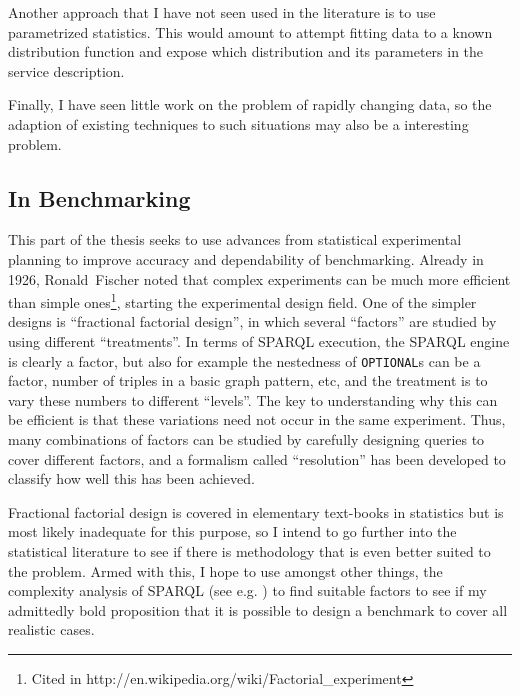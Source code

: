 \documentclass{llncs}
\begin{document}
Another approach that I have not seen used in the literature is to use
parametrized statistics. This would amount to attempt fitting data to
a known distribution function and expose which distribution and its
parameters in the service description.

Finally, I have seen little work on the problem of rapidly changing
data, so the adaption of existing techniques to such situations may
also be a interesting problem.


\subsection{In Benchmarking}

This part of the thesis seeks to use advances from statistical
experimental planning to improve accuracy and dependability of
benchmarking. Already in 1926, Ronald~Fischer noted that complex
experiments can be much more efficient than simple ones\footnote{Cited
  in http://en.wikipedia.org/wiki/Factorial\_experiment}, starting the
experimental design field. One of the simpler designs is ``fractional
factorial design'', in which several ``factors'' are studied by using
different ``treatments''. In terms of SPARQL execution, the SPARQL
engine is clearly a factor, but also for example the nestedness of
\texttt{OPTIONAL}s can be a factor, number of triples in a basic graph
pattern, etc, and the treatment is to vary these numbers to different
``levels''. The key to understanding why this can be efficient is that
these variations need not occur in the same experiment. Thus, many
combinations of factors can be studied by carefully designing queries
to cover different factors, and a formalism called ``resolution'' has
been developed to classify how well this has been achieved.

Fractional factorial design is covered in elementary text-books in
statistics but is most likely inadequate for this purpose, so I
intend to go further into the statistical literature to see if there
is methodology that is even better suited to the problem. Armed with
this, I hope to use amongst other things, the complexity analysis of
SPARQL (see e.g. \cite{Schmidt:2010:FSQ:1804669.1804675}) to find
suitable factors to see if my admittedly bold proposition that it is
possible to design a benchmark to cover all realistic cases.




\end{document}
